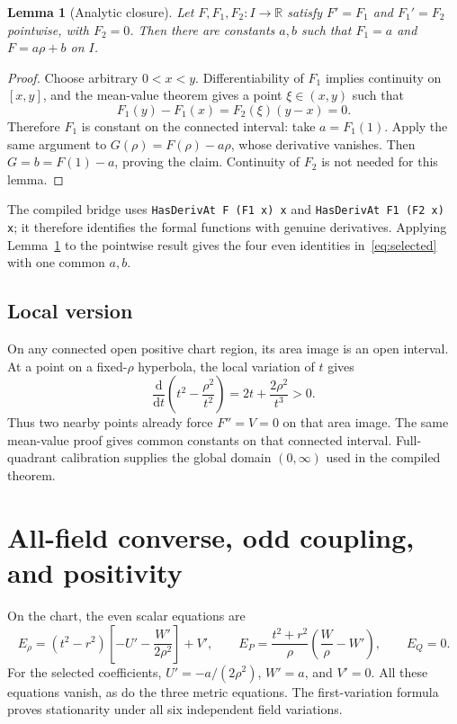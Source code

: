 \documentclass[11pt]{article}
\newtheorem{lemma}[theorem]{Lemma}
\newcommand{\R}{\mathbb R}
\newcommand{\dd}{\mathrm d}
\begin{document}
\begin{lemma}[Analytic closure]\label{lem:mvt}
Let $F,F_1,F_2:I\to\R$ satisfy $F'=F_1$ and $F_1'=F_2$ pointwise, with $F_2=0$. Then there are constants $a,b$ such that $F_1=a$ and $F=a\rho+b$ on $I$.
\end{lemma}
\begin{proof}
Choose arbitrary $0<x<y$. Differentiability of $F_1$ implies continuity on $[x,y]$, and the mean-value theorem gives a point $\xi\in(x,y)$ such that
\begin{equation}
 F_1(y)-F_1(x)=F_2(\xi)(y-x)=0.
\end{equation}
Therefore $F_1$ is constant on the connected interval: take $a=F_1(1)$. Apply the same argument to $G(\rho)=F(\rho)-a\rho$, whose derivative vanishes. Then $G=b=F(1)-a$, proving the claim. Continuity of $F_2$ is not needed for this lemma.
\end{proof}

The compiled bridge uses \texttt{HasDerivAt F (F1 x) x} and \texttt{HasDerivAt F1 (F2 x) x}; it therefore identifies the formal functions with genuine derivatives. Applying Lemma~\ref{lem:mvt} to the pointwise result gives the four even identities in~\eqref{eq:selected} with one common $a,b$.

\subsection{Local version}

On any connected open positive chart region, its area image is an open interval. At a point on a fixed-$\rho$ hyperbola, the local variation of $t$ gives
\begin{equation}
 \frac{\dd}{\dd t}\left(t^2-\frac{\rho^2}{t^2}\right)=2t+\frac{2\rho^2}{t^3}>0.
\end{equation}
Thus two nearby points already force $F''=V=0$ on that area image. The same mean-value proof gives common constants on that connected interval. Full-quadrant calibration supplies the global domain $(0,\infty)$ used in the compiled theorem.

\section{All-field converse, odd coupling, and positivity}\label{sec:converse}

On the chart, the even scalar equations are
\begin{equation}
 E_\rho=(t^2-r^2)\left[-U'-\frac{W'}{2\rho^2}\right]+V',\qquad
 E_P=\frac{t^2+r^2}{\rho}\left(\frac W\rho-W'\right),\qquad E_Q=0.
\end{equation}
For the selected coefficients, $U'=-a/(2\rho^2)$, $W'=a$, and $V'=0$. All these equations vanish, as do the three metric equations. The first-variation formula proves stationarity under all six independent field variations.
\end{document}
